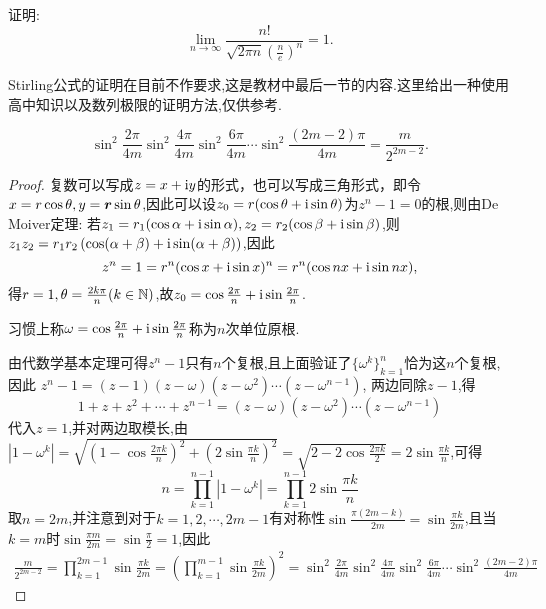 \begin{example}[Stirling公式]
    证明:$$\lim_{n \to \infty} \frac{n !}{\sqrt{2 \pi n} \left( \frac{n}{e} \right)^n} = 1.$$
\end{example}

Stirling公式的证明在目前不作要求,这是教材中最后一节的内容.这里给出一种使用高中知识以及数列极限的证明方法,仅供参考.

\begin{lemma}\label{lem:Stirling-1}
    $$\sin^2\frac{2\pi}{4m}\sin^2\frac{4\pi}{4m}\sin^2\frac{6\pi}{4m}\cdots\sin^2\frac{(2m-2)\pi}{4m} = \frac{m}{2^{2m-2}}.$$
\end{lemma}

\begin{proof}
    复数可以写成$z = x + \mathrm{i} y$的形式，也可以写成三角形式，即令$ x = r \cos \theta, y = \bm{r} \sin \theta$,因此可以设$z_0 = r ( \cos \theta + \mathrm{i} \sin \theta)$为$z^n - 1 =0$的根,则由De Moiver定理:
    若$z_1 = r_1 ( \cos \alpha + \mathrm{i} \sin \alpha) , z_2  = r_2 ( \cos \beta + \mathrm{i} \sin \beta)$,则$z_1 z_2 = r_1 r_2 \left( \cos (\alpha+ \beta) + \mathrm{i} \sin (\alpha+ \beta) \right)$,因此
    $$z^n = 1 = r^n ( \cos x + \mathrm{i} \sin x)^n = r^n ( \cos nx + \mathrm{i} \sin nx), $$得$r=1, \theta = \frac{2k \pi}{n} ( k \in \mathbb{N})$,故$z_0 = \cos \frac{2\pi}{n} + \mathrm{i} \sin \frac{2\pi}{n}$.

    习惯上称$\omega = \cos \frac{2\pi}{n} + \mathrm{i} \sin \frac{2\pi}{n}$称为$n$次单位原根.

    由代数学基本定理可得$z^n-1$只有$n$个复根,且上面验证了$\{ \omega^k \}_{k=1}^n$恰为这$n$个复根,因此
    $z^n - 1 = (z-1)(z-\omega)(z-\omega^2) \cdots (z-\omega^{n-1})$,
    两边同除$z-1$,得
    $$1 + z + z^2 + \cdots + z^{n-1} = (z-\omega)(z-\omega^2) \cdots (z-\omega^{n-1})$$
    代入$z=1$,并对两边取模长,由$\left|1-\omega^{k}\right| = \sqrt{\left( 1- \cos \frac{2\pi k}{n}\right)^2 + \left(2\sin \frac{\pi k}{n}\right)^2 } = \sqrt{2-2\cos \frac{2\pi k}{2}} = 2\sin \frac{\pi k}{n}$,可得
    $$n = \prod_{k=1}^{n-1} \left| 1- \omega^k \right| = \prod_{k=1}^{n-1} {2 \sin \frac{\pi k}{n}}$$
    取$n=2m$,并注意到对于$k=1,2,\cdots,2m-1$有对称性$\sin \frac{\pi (2m -k)}{2m} = \sin \frac{\pi k}{2m}$,且当$k =m$时$\sin \frac{\pi m}{2m} = \sin \frac{\pi}{2} =1$,因此
    \begin{align*}
        \frac{m}{2^{2m-2}} = \prod_{k=1}^{2m-1} \sin \frac{\pi k}{2m} = \left( \prod_{k=1}^{m-1} \sin \frac{\pi k}{2m} \right)^2 =\sin^2\frac{2\pi}{4m}\sin^2\frac{4\pi}{4m}\sin^2\frac{6\pi}{4m}\cdots\sin^2\frac{(2m-2)\pi}{4m}
    \end{align*}
\end{proof}

